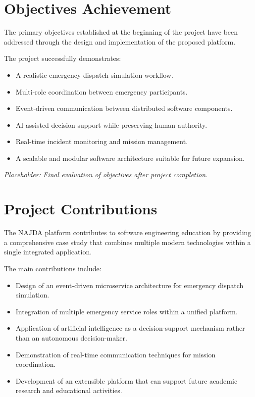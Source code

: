 \section{Objectives Achievement}

The primary objectives established at the beginning of the project have been addressed through the design and implementation of the proposed platform.

The project successfully demonstrates:

\begin{itemize}
    \item A realistic emergency dispatch simulation workflow.
    \item Multi-role coordination between emergency participants.
    \item Event-driven communication between distributed software components.
    \item AI-assisted decision support while preserving human authority.
    \item Real-time incident monitoring and mission management.
    \item A scalable and modular software architecture suitable for future expansion.
\end{itemize}

\textit{Placeholder: Final evaluation of objectives after project completion.}


\section{Project Contributions}

The NAJDA platform contributes to software engineering education by providing a comprehensive case study that combines multiple modern technologies within a single integrated application.

The main contributions include:

\begin{itemize}
    \item Design of an event-driven microservice architecture for emergency dispatch simulation.
    \item Integration of multiple emergency service roles within a unified platform.
    \item Application of artificial intelligence as a decision-support mechanism rather than an autonomous decision-maker.
    \item Demonstration of real-time communication techniques for mission coordination.
    \item Development of an extensible platform that can support future academic research and educational activities.
\end{itemize}

